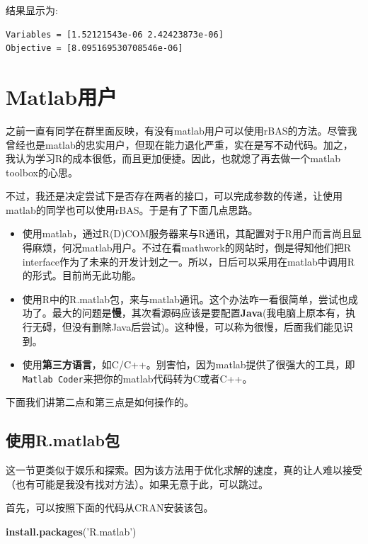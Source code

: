 \documentclass[]{ctexbook}
\newenvironment{Shaded}{\begin{snugshade}}{\end{snugshade}}
\newcommand{\KeywordTok}[1]{\textcolor[rgb]{0.13,0.29,0.53}{\textbf{#1}}}
\newcommand{\StringTok}[1]{\textcolor[rgb]{0.31,0.60,0.02}{#1}}
\newcommand{\NormalTok}[1]{#1}
\providecommand{\tightlist}{%
  \setlength{\itemsep}{0pt}\setlength{\parskip}{0pt}}
\begin{document}
结果显示为:

\begin{verbatim}
Variables = [1.52121543e-06 2.42423873e-06]
Objective = [8.095169530708546e-06]
\end{verbatim}

\chapter{Matlab用户}\label{matlabr}

之前一直有同学在群里面反映，有没有matlab用户可以使用rBAS的方法。尽管我曾经也是matlab的忠实用户，但现在能力退化严重，实在是写不动代码。加之，我认为学习R的成本很低，而且更加便捷。因此，也就熄了再去做一个matlab
toolbox的心思。

不过，我还是决定尝试下是否存在两者的接口，可以完成参数的传递，让使用matlab的同学也可以使用rBAS。于是有了下面几点思路。

\begin{itemize}
\tightlist
\item
  使用matlab，通过R(D)COM服务器来与R通讯，其配置对于R用户而言尚且显得麻烦，何况matlab用户。不过在看mathwork的网站时，倒是得知他们把R
  interface作为了未来的开发计划之一。所以，日后可以采用在matlab中调用R的形式。目前尚无此功能。
\item
  使用R中的R.matlab包，来与matlab通讯。这个办法咋一看很简单，尝试也成功了。最大的问题是\textbf{慢}，其次看源码应该是要配置\textbf{Java}(我电脑上原本有，执行无碍，但没有删除Java后尝试)。这种慢，可以称为很慢，后面我们能见识到。
\item
  使用\textbf{第三方语言}，如C/C++。别害怕，因为matlab提供了很强大的工具，即\texttt{Matlab\ Coder}来把你的matlab代码转为C或者C++。
\end{itemize}

下面我们讲第二点和第三点是如何操作的。

\section{使用R.matlab包}\label{r.matlab}

这一节更类似于娱乐和探索。因为该方法用于优化求解的速度，真的让人难以接受（也有可能是我没有找对方法）。如果无意于此，可以跳过。

首先，可以按照下面的代码从CRAN安装该包。

\begin{Shaded}
\begin{Highlighting}[]
\KeywordTok{install.packages}\NormalTok{(}\StringTok{'R.matlab'}\NormalTok{)}
\end{Highlighting}
\end{Shaded}
\end{document}
